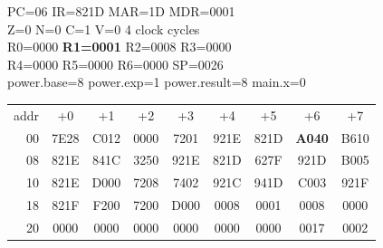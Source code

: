 \begin{tcolorbox}[stepbox, title={Step 21 \hfill PC 05 \quad LD R1, power.exp}]
PC=06 IR=821D MAR=1D MDR=0001\\
Z=0 N=0 C=1 V=0 \hfill \textcolor{dim}{4 clock cycles}\\
R0=0000 \textcolor{wrt}{\textbf{R1=0001}} R2=0008 R3=0000\\
R4=0000 R5=0000 R6=0000 SP=0026\\
\textcolor{dim}{power.base=8  power.exp=1  power.result=8  main.x=0}\\[1pt]
{\setlength{\tabcolsep}{1.6pt}\begin{tabular}{@{}r*{8}{c}@{}}
\textcolor{dim}{addr} & \textcolor{dim}{+0} & \textcolor{dim}{+1} & \textcolor{dim}{+2} & \textcolor{dim}{+3} & \textcolor{dim}{+4} & \textcolor{dim}{+5} & \textcolor{dim}{+6} & \textcolor{dim}{+7}\\
\textcolor{dim}{00} & 7E28 & C012 & 0000 & 7201 & 921E & 821D & \cellcolor{pcc}\textbf{A040} & B610\\
\textcolor{dim}{08} & 821E & 841C & 3250 & 921E & 821D & 627F & 921D & B005\\
\textcolor{dim}{10} & 821E & D000 & 7208 & 7402 & 921C & 941D & C003 & 921F\\
\textcolor{dim}{18} & 821F & F200 & 7200 & D000 & \cellcolor{datac}0008 & \cellcolor{datac}0001 & \cellcolor{datac}0008 & \cellcolor{datac}0000\\
\textcolor{dim}{20} & \cellcolor{stackc}0000 & \cellcolor{stackc}0000 & \cellcolor{stackc}0000 & \cellcolor{stackc}0000 & \cellcolor{stackc}0000 & \cellcolor{stackc}0000 & \cellcolor{stackc}0017 & \cellcolor{stackc}0002\\
\end{tabular}}
\end{tcolorbox}\par\vspace{3pt}
